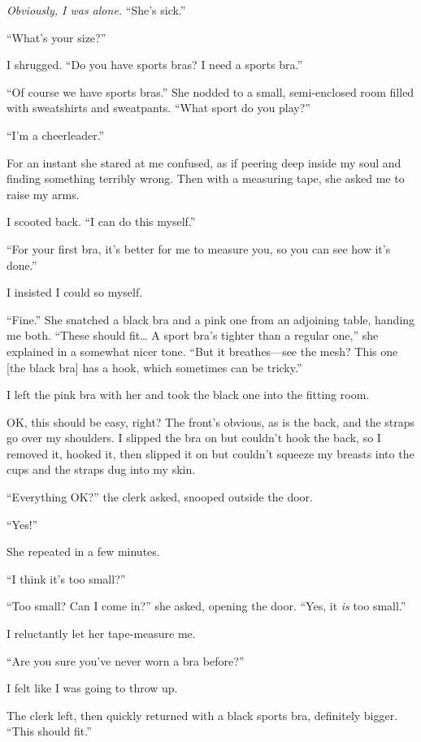 \emph{Obviously, I was alone.} ``She's sick.''

``What's your size?''

I shrugged. ``Do you have sports bras? I need a sports bra.''

``Of course we have sports bras.'' She nodded to a small, semi-enclosed
room filled with sweatshirts and sweatpants. ``What sport do you play?''

``I'm a cheerleader.''

For an instant she stared at me confused, as if peering deep inside my
soul and finding something terribly wrong. Then with a measuring tape,
she asked me to raise my arms.

I scooted back. ``I can do this myself.''

``For your first bra, it's better for me to measure you, so you can see
how it's done.''

I insisted I could so myself.

``Fine.'' She snatched a black bra and a pink one from an adjoining
table, handing me both. ``These should fit\ldots{} A sport bra's tighter
than a regular one,'' she explained in a somewhat nicer tone. ``But it
breathes---see the mesh? This one {[}the black bra{]} has a hook, which
sometimes can be tricky.''

I left the pink bra with her and took the black one into the fitting
room.

OK, this should be easy, right? The front's obvious, as is the back, and
the straps go over my shoulders. I slipped the bra on but couldn't hook
the back, so I removed it, hooked it, then slipped it on but couldn't
squeeze my breasts into the cups and the straps dug into my skin.

``Everything OK?'' the clerk asked, snooped outside the door.

``Yes!''

She repeated in a few minutes.

``I think it's too small?''

``Too small? Can I come in?'' she asked, opening the door. ``Yes, it
\emph{is} too small.''

I reluctantly let her tape-measure me.

``Are you sure you've never worn a bra before?''

I felt like I was going to throw up.

The clerk left, then quickly returned with a black sports bra,
definitely bigger. ``This should fit.''

